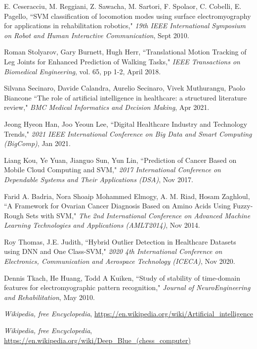 \documentclass[12pt]{article}
\begin{document}
\begin{thebibliography}{10}
 E. Ceseracciu, M. Reggiani, Z. Sawacha, M. Sartori, F. Spolaor, C. Cobelli, E. Pagello, ``SVM classification of locomotion modes using surface electromyography
for applications in rehabilitation robotics," \emph{19th IEEE International Symposium on Robot and
Human Interactive Communication}, Sept 2010.

 Roman Stolyarov, Gary Burnett, Hugh Herr, ``Translational Motion Tracking of Leg Joints for
Enhanced Prediction of Walking Tasks," \emph{IEEE Transactions on Biomedical Engineering}, vol. 65, pp 1-2, April 2018.

 Silvana Secinaro, Davide Calandra, Aurelio Secinaro, Vivek Muthurangu, Paolo Biancone ``The role of artificial intelligence
in healthcare: a structured literature review," \emph{BMC Medical Informatics and Decision Making}, Apr 2021.

 Jeong Hyeon Han, Joo Yeoun Lee, ``Digital Healthcare Industry and Technology Trends," \emph{2021 IEEE International Conference on Big Data and Smart Computing (BigComp)}, Jan 2021.

 Liang Kou, Ye Yuan, Jianguo Sun, Yun Lin, ``Prediction of Cancer Based on Mobile Cloud Computing and SVM," \emph{ 2017 International Conference on Dependable Systems and Their Applications (DSA)}, Nov 2017.

 Farid A. Badria, Nora Shoaip Mohammed Elmogy, A. M. Riad, Hosam Zaghloul, ``A Framework for Ovarian Cancer Diagnosis Based on Amino Acids Using Fuzzy-Rough Sets with SVM," \emph{The 2nd International Conference on Advanced Machine Learning Technologies and Applications (AMLT2014)}, Nov 2014.

 Roy Thomas, J.E. Judith, ``Hybrid Outlier Detection in Healthcare Datasets
using DNN and One Class-SVM," \emph{2020 4th International Conference on Electronics, Communication and Aerospace Technology (ICECA)}, Nov 2020.

 Dennis Tkach, He Huang, Todd A Kuiken, ``Study of stability of time-domain features for electromyographic pattern recognition," \emph{Journal of NeuroEngineering and Rehabilitation}, May 2010.

 \emph{Wikipedia, free Encyclopedia}, \url{https://en.wikipedia.org/wiki/Artificial_intelligence}

 \emph{Wikipedia, free Encyclopedia}, \url{https://en.wikipedia.org/wiki/Deep_Blue_(chess_computer)}


\end{thebibliography}
\end{document}
